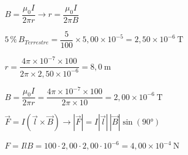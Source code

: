 \begin{solapartat}
 $B = \dfrac{\mu_0 I}{2\pi r} \rightarrow r = \dfrac{\mu_0 I}{2\pi B}$

 $5\,\%\,B_\mathit{Terrestre} = \dfrac{5}{100}\times 5,00\times 10^{-5} = 2,50\times 10^{-6}\ \mathrm{T}$

 $r = \dfrac{4\pi\times 10^{-7}\times 100}{2\pi\times 2,50\times 10^{-6}} = 8,0\ \mathrm{m}$
\end{solapartat}

\begin{solapartat}


 $B = \dfrac{\mu_0 I}{2\pi r} = \dfrac{4\pi\times 10^{-7}\times 100}{2\pi\times 10} = 2,00\times 10^{-6}\ \mathrm{T}$

 $\vec{F} = I(\vec{l}\times\vec{B}) \rightarrow |\vec{F}| = I|\vec{l}|\,|\vec{B}|\sin(90°)$

$F = IlB = 100\cdot 2,00\cdot 2,00\cdot 10^{-6} = 4,00\times 10^{-4}\ \mathrm{N}$
\end{solapartat}
